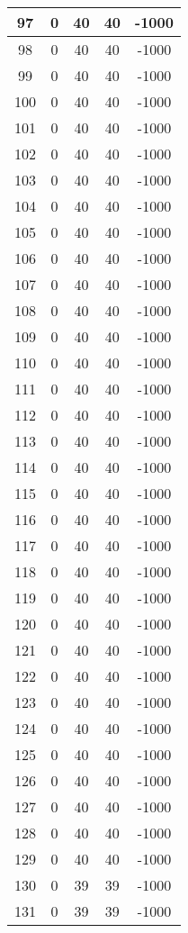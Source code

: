 \documentclass[letterpaper, 12pt]{article}
\begin{document}
\begin{longtable}{|c|c|c|c|c|}
\hline
97 & 0 & 40 & 40 & -1000 \\
\hline
98 & 0 & 40 & 40 & -1000 \\
\hline
99 & 0 & 40 & 40 & -1000 \\
\hline
100 & 0 & 40 & 40 & -1000 \\
\hline
101 & 0 & 40 & 40 & -1000 \\
\hline
102 & 0 & 40 & 40 & -1000 \\
\hline
103 & 0 & 40 & 40 & -1000 \\
\hline
104 & 0 & 40 & 40 & -1000 \\
\hline
105 & 0 & 40 & 40 & -1000 \\
\hline
106 & 0 & 40 & 40 & -1000 \\
\hline
107 & 0 & 40 & 40 & -1000 \\
\hline
108 & 0 & 40 & 40 & -1000 \\
\hline
109 & 0 & 40 & 40 & -1000 \\
\hline
110 & 0 & 40 & 40 & -1000 \\
\hline
111 & 0 & 40 & 40 & -1000 \\
\hline
112 & 0 & 40 & 40 & -1000 \\
\hline
113 & 0 & 40 & 40 & -1000 \\
\hline
114 & 0 & 40 & 40 & -1000 \\
\hline
115 & 0 & 40 & 40 & -1000 \\
\hline
116 & 0 & 40 & 40 & -1000 \\
\hline
117 & 0 & 40 & 40 & -1000 \\
\hline
118 & 0 & 40 & 40 & -1000 \\
\hline
119 & 0 & 40 & 40 & -1000 \\
\hline
120 & 0 & 40 & 40 & -1000 \\
\hline
121 & 0 & 40 & 40 & -1000 \\
\hline
122 & 0 & 40 & 40 & -1000 \\
\hline
123 & 0 & 40 & 40 & -1000 \\
\hline
124 & 0 & 40 & 40 & -1000 \\
\hline
125 & 0 & 40 & 40 & -1000 \\
\hline
126 & 0 & 40 & 40 & -1000 \\
\hline
127 & 0 & 40 & 40 & -1000 \\
\hline
128 & 0 & 40 & 40 & -1000 \\
\hline
129 & 0 & 40 & 40 & -1000 \\
\hline
130 & 0 & 39 & 39 & -1000 \\
\hline
131 & 0 & 39 & 39 & -1000 \\

\end{longtable}
\end{document}
